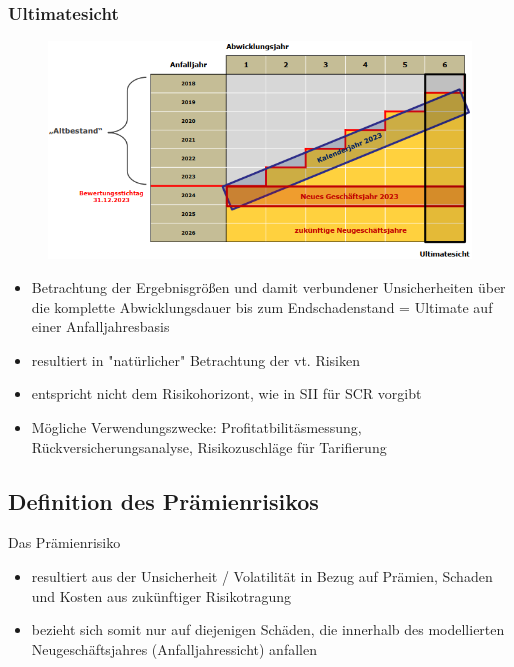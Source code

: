 \documentclass[12pt]{report}
\theoremstyle{dotless}
\theoremstyle{definition}
\begin{document}
\subsubsection{Ultimatesicht}

\begin{figure}[ht]
	\centering
	\includegraphics[width= \textwidth]{Bilder/Ultimatesicht.png}
\end{figure}

\begin{itemize}
\item Betrachtung der Ergebnisgrößen und damit verbundener Unsicherheiten über die komplette Abwicklungsdauer bis zum Endschadenstand = Ultimate auf einer Anfalljahresbasis
\item resultiert in "natürlicher" Betrachtung der vt. Risiken
\item entspricht nicht dem Risikohorizont, wie in SII für SCR vorgibt
\item Mögliche Verwendungszwecke: Profitatbilitäsmessung, Rückversicherungsanalyse, Risikozuschläge für Tarifierung
\end{itemize}

\subsection{Definition des Prämienrisikos}

Das Prämienrisiko
\begin{itemize}
\item resultiert aus der Unsicherheit / Volatilität in Bezug auf Prämien, Schaden und Kosten aus zukünftiger Risikotragung
\item bezieht sich somit nur auf diejenigen Schäden, die innerhalb des modellierten Neugeschäftsjahres (Anfalljahressicht) anfallen
\end{itemize}
\end{document}
